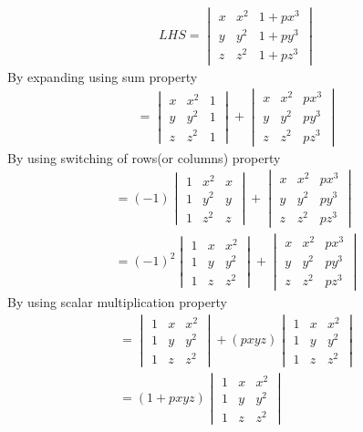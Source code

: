 \begin{align}
LHS=\begin{vmatrix}
x&x^2&1+px^3\\y&y^2&1+py^3\\z&z^2&1+pz^3
\end{vmatrix}
\end{align}
By expanding using sum property
\begin{align}
=\begin{vmatrix}
x&x^2&1\\y&y^2&1\\z&z^2&1
\end{vmatrix}
+\begin{vmatrix}
x&x^2&px^3\\y&y^2&py^3\\z&z^2&pz^3
\end{vmatrix}
\end{align}
By using switching of rows(or columns) property
\begin{align}
=(-1)\begin{vmatrix}
1&x^2&x\\1&y^2&y\\1&z^2&z
\end{vmatrix}
+\begin{vmatrix}
x&x^2&px^3\\y&y^2&py^3\\z&z^2&pz^3
\end{vmatrix}\\
=(-1)^2\begin{vmatrix}
1&x&x^2\\1&y&y^2\\1&z&z^2
\end{vmatrix}
+\begin{vmatrix}
x&x^2&px^3\\y&y^2&py^3\\z&z^2&pz^3
\end{vmatrix}
\end{align}
By using scalar multiplication property
\begin{align}
=\begin{vmatrix}
1&x&x^2\\1&y&y^2\\1&z&z^2
\end{vmatrix}
+(pxyz)\begin{vmatrix}
1&x&x^2\\1&y&y^2\\1&z&z^2
\end{vmatrix}\\
=(1+pxyz)\begin{vmatrix}
1&x&x^2\\1&y&y^2\\1&z&z^2
\end{vmatrix}
\end{align}
